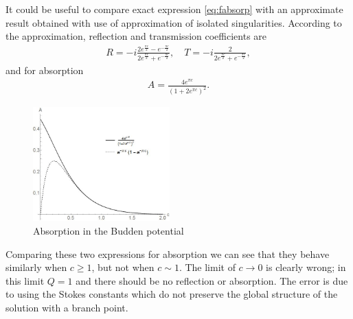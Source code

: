 \documentclass[aip,jmp,reprint]{revtex4-1}
\def\mytextwidth{0.47\textwidth}
\begin{document}
It could be useful to compare exact expression \eqref{eq:fabsorp} with an approximate result 
obtained with use of approximation of isolated singularities. According to the 
approximation\cite{rwbook}, reflection and transmission coefficients are
\begin{eqnarray}
R=-i\frac{2e^{\frac{\pi c}{2}}-e^{-\frac{\pi c}{2}}}{2e^{\frac{\pi c}{2}}+e^{-\frac{\pi c}{2}}}, \quad 
T=-i\frac{2}{2e^{\frac{\pi c}{2}}+e^{-\frac{\pi c}{2}}},
\end{eqnarray}
and for absorption
\begin{eqnarray}
A = \frac{4 e^{\pi c}}{(1+2e^{\pi c})^2}.
\end{eqnarray}

\begin{figure}
\centering
\noindent
\includegraphics[width=\mytextwidth]{stuff/comparison.jpg}
\caption{Absorption in the Budden potential}
\label{cmprsn}
\end{figure} 

Comparing these two expressions for absorption we can see that they behave similarly when $c\geq1$, 
but not when $c \sim 1$. The limit of $c\rightarrow 0$ is clearly wrong; in this limit $Q=1$
and there should be no reflection or absorption. The error is due to using the Stokes constants 
which do not preserve the global structure of the solution with a branch point. 
\end{document}
